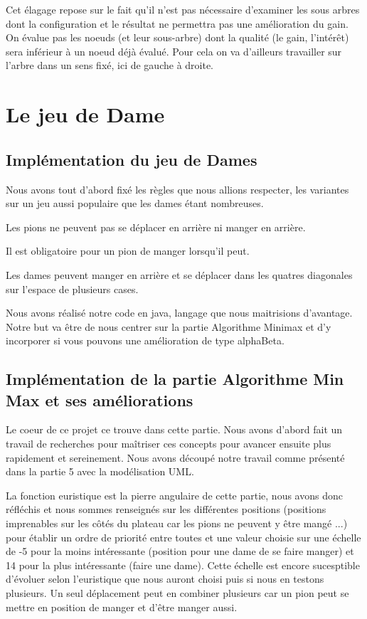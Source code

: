 \documentclass[12,french]{report}
\begin{document}
Cet élagage repose sur le fait qu'il n'est pas nécessaire d'examiner
les sous arbres dont la configuration et le résultat ne permettra
pas une amélioration du gain. On évalue pas les noeuds (et leur sous-arbre)
dont la qualité (le gain, l'intérêt) sera inférieur à un noeud déjà
évalué. Pour cela on va d'ailleurs travailler sur l'arbre dans un
sens fixé, ici de gauche à droite. 


\chapter{Le jeu de Dame}

\section{Implémentation du jeu de Dames}

Nous avons tout d'abord fixé les règles que nous allions respecter,
les variantes sur un jeu aussi populaire que les dames étant nombreuses.

Les pions ne peuvent pas se déplacer en arrière ni manger en arrière. 

Il est obligatoire pour un pion de manger lorsqu'il peut.

Les dames peuvent manger en arrière et se déplacer dans les quatres
diagonales sur l'espace de plusieurs cases. 

Nous avons réalisé notre code en java, langage que nous maitrisions
d'avantage. Notre but va être de nous centrer sur la partie Algorithme
Minimax et d'y incorporer si vous pouvons une amélioration de type
alphaBeta.

\section{Implémentation de la partie Algorithme Min Max et ses améliorations}

Le coeur de ce projet ce trouve dans cette partie. Nous avons d'abord
fait un travail de recherches pour maîtriser ces concepts pour avancer
ensuite plus rapidement et sereinement. Nous avons découpé notre travail
comme présenté dans la partie 5 avec la modélisation UML.

La fonction euristique est la pierre angulaire de cette partie, nous
avons donc réfléchis et nous sommes renseignés sur les différentes
positions (positions imprenables sur les côtés du plateau car les
pions ne peuvent y être mangé ...) pour établir un ordre de priorité
entre toutes et une valeur choisie sur une échelle de -5 pour la moins
intéressante (position pour une dame de se faire manger) et 14 pour
la plus intéressante (faire une dame). Cette échelle est encore sucesptible
d'évoluer selon l'euristique que nous auront choisi puis si nous en
testons plusieurs. Un seul déplacement peut en combiner plusieurs
car un pion peut se mettre en position de manger et d'être manger
aussi.
\end{document}
